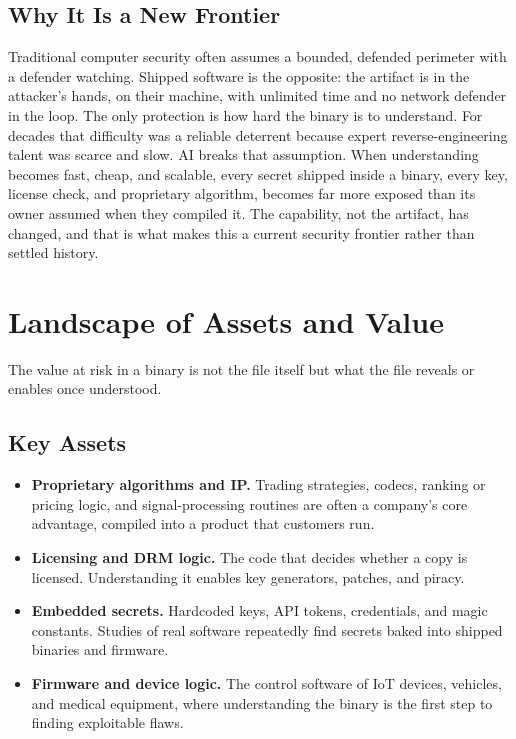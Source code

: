 \documentclass[conference]{IEEEtran}
\begin{document}
\subsection{Why It Is a New Frontier}
Traditional computer security often assumes a bounded, defended perimeter with a
defender watching. Shipped software is the opposite: the artifact is in the
attacker's hands, on their machine, with unlimited time and no network defender in
the loop. The only protection is how hard the binary is to understand. For decades
that difficulty was a reliable deterrent because expert reverse-engineering talent
was scarce and slow. AI breaks that assumption. When understanding becomes fast,
cheap, and scalable, every secret shipped inside a binary, every key, license
check, and proprietary algorithm, becomes far more exposed than its owner assumed
when they compiled it. The capability, not the artifact, has changed, and that is
what makes this a current security frontier rather than settled history.

\section{Landscape of Assets and Value}
The value at risk in a binary is not the file itself but what the file reveals or
enables once understood.

\subsection{Key Assets}
\begin{itemize}
\item \textbf{Proprietary algorithms and IP.} Trading strategies, codecs, ranking
or pricing logic, and signal-processing routines are often a company's core
advantage, compiled into a product that customers run.
\item \textbf{Licensing and DRM logic.} The code that decides whether a copy is
licensed. Understanding it enables key generators, patches, and piracy.
\item \textbf{Embedded secrets.} Hardcoded keys, API tokens, credentials, and magic
constants. Studies of real software repeatedly find secrets baked into shipped
binaries and firmware.
\item \textbf{Firmware and device logic.} The control software of IoT devices,
vehicles, and medical equipment, where understanding the binary is the first step
to finding exploitable flaws.
\end{itemize}
\end{document}
